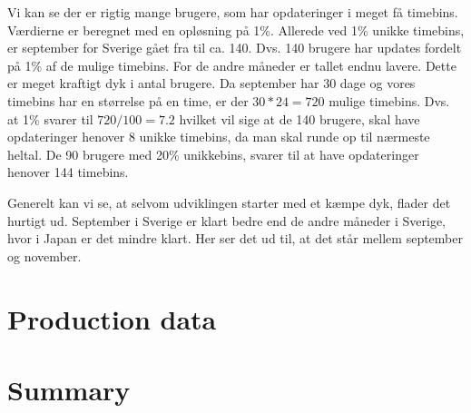 Vi kan se der er rigtig mange brugere, som har opdateringer i meget få timebins. Værdierne er beregnet med en opløsning på 1\%. Allerede ved 1\% unikke timebins, er september for Sverige gået fra \numberUsersSweden{} til ca. 140. Dvs. 140 brugere har updates fordelt på 1\% af de mulige timebins. For de andre måneder er tallet endnu lavere. Dette er meget kraftigt dyk i antal brugere. 
Da september har 30 dage og vores timebins har en størrelse på en time, er der $30*24=720$ mulige timebins. Dvs. at 1\% svarer til $720/100=7.2$ hvilket vil sige at de 140 brugere, skal have opdateringer henover 8 unikke timebins, da man skal runde op til nærmeste heltal. 
De 90 brugere med 20\% unikkebins, svarer til at have opdateringer henover 144 timebins. 

Generelt kan vi se, at selvom udviklingen starter med et kæmpe dyk, flader det hurtigt ud. September i Sverige er klart bedre end de andre måneder i Sverige, hvor i Japan er det mindre klart. Her ser det ud  til, at det står mellem september og november. 




\section{Production data}


\section{Summary}